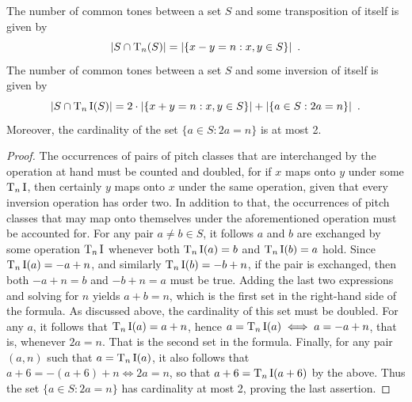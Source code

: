 \begin{theorem}
	\label{rahn-common-tone}
	\cite[10]{Rahn1975}
	The number of common tones between a set $S$ and some transposition of itself is given by
	\begin{equation}
		|S \cap \operatorname{T}_n(S)| = |\{x - y = n : x, y \in S\}| \enspace.
	\end{equation}
	The number of common tones between a set $S$ and some inversion of itself is given by
	\begin{equation}
		|S \cap \operatorname{T}_n\operatorname{I}(S)| = 2 \cdot |\{x + y = n : x, y \in S\}| + |\{a \in S : 2a = n\}| \enspace.
	\end{equation}
	Moreover, the cardinality of the set $\{a \in S : 2a = n\}$ is at most 2.
	\begin{proof}
		The occurrences of pairs of pitch classes that are interchanged by the operation at hand must be counted and doubled, for if $x$ maps onto $y$ under some $\operatorname{T}_n\operatorname{I}$, then certainly $y$ maps onto $x$ under the same operation, given that every inversion operation has order two. In addition to that, the occurrences of pitch classes that may map onto themselves under the aforementioned operation must be accounted for. For any pair $a \ne b \in S$, it follows $a$ and $b$ are exchanged by some operation $\operatorname{T}_n\operatorname{I}$ whenever both $\operatorname{T}_n\operatorname{I}(a) = b$ and $\operatorname{T}_n\operatorname{I}(b) = a$ hold. Since $\operatorname{T}_n\operatorname{I}(a) = -a + n$, and similarly $\operatorname{T}_n\operatorname{I}(b) = -b + n$, if the pair is exchanged, then both $-a + n = b$ and $-b + n = a$ must be true. Adding the last two expressions and solving for $n$ yields $a + b = n$, which is the first set in the right-hand side of the formula. As discussed above, the cardinality of this set must be doubled. For any $a$, it follows that $\operatorname{T}_n\operatorname{I}(a) = a + n$, hence $a = \operatorname{T}_n\operatorname{I}(a) \iff a = -a + n$, that is, whenever $2a = n$. That is the second set in the formula. Finally, for any pair $(a, n)$ such that $a = \operatorname{T}_n\operatorname{I}(a)$, it also follows that $a + 6 = -(a + 6) + n \iff 2a = n$, so that $a + 6 = \operatorname{T}_n\operatorname{I}(a + 6)$ by the above. Thus the set $\{a \in S : 2a = n\}$ has cardinality at most 2, proving the last assertion.
	\end{proof}
\end{theorem}

